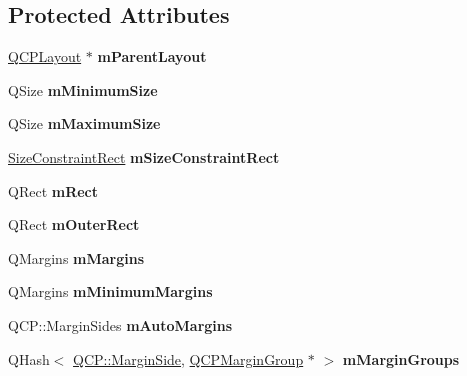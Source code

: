 \subsection*{Protected Attributes}
\begin{DoxyCompactItemize}
\item 
\mbox{\label{classQCPLayoutElement_ae7c75c25549608bd688bdb65d4c38066}} 
\hyperlink{classQCPLayout}{Q\+C\+P\+Layout} $\ast$ {\bfseries m\+Parent\+Layout}
\item 
\mbox{\label{classQCPLayoutElement_affef747c81632de33f08483b7fd10d01}} 
Q\+Size {\bfseries m\+Minimum\+Size}
\item 
\mbox{\label{classQCPLayoutElement_a64a387973fd4addac842028c89088998}} 
Q\+Size {\bfseries m\+Maximum\+Size}
\item 
\mbox{\label{classQCPLayoutElement_acc012635b1ae178ff3c4da8a3af303a2}} 
\hyperlink{classQCPLayoutElement_a0afb3e5773529e4bd20e448f81be4d2a}{Size\+Constraint\+Rect} {\bfseries m\+Size\+Constraint\+Rect}
\item 
\mbox{\label{classQCPLayoutElement_ad8896f05550389f7b9e92c9e6cdf6e01}} 
Q\+Rect {\bfseries m\+Rect}
\item 
\mbox{\label{classQCPLayoutElement_a07bb4973379e75cb0fa5b032c1d24afd}} 
Q\+Rect {\bfseries m\+Outer\+Rect}
\item 
\mbox{\label{classQCPLayoutElement_ac2a32b99ee527ca5dfff9da03628fe94}} 
Q\+Margins {\bfseries m\+Margins}
\item 
\mbox{\label{classQCPLayoutElement_a5ba71f25d1af4bb092b28df618538e63}} 
Q\+Margins {\bfseries m\+Minimum\+Margins}
\item 
\mbox{\label{classQCPLayoutElement_af61c70354d1275778d68206b2a1b2d36}} 
Q\+C\+P\+::\+Margin\+Sides {\bfseries m\+Auto\+Margins}
\item 
\mbox{\label{classQCPLayoutElement_aeafbbc1130e02eee663c5326761fc963}} 
Q\+Hash$<$ \hyperlink{namespaceQCP_a7e487e3e2ccb62ab7771065bab7cae54}{Q\+C\+P\+::\+Margin\+Side}, \hyperlink{classQCPMarginGroup}{Q\+C\+P\+Margin\+Group} $\ast$ $>$ {\bfseries m\+Margin\+Groups}
\end{DoxyCompactItemize}
